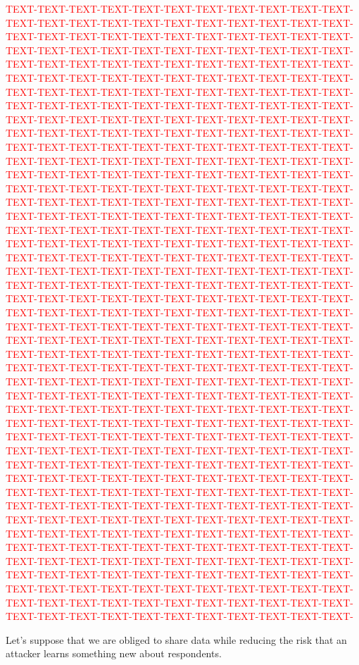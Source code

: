 \documentclass[a0,portrait]{a0poster}
\begin{document}
\begin{multicols}{3}
\textcolor{red}{
TEXT-TEXT-TEXT-TEXT-TEXT-TEXT-TEXT-TEXT-TEXT-TEXT-TEXT-
TEXT-TEXT-TEXT-TEXT-TEXT-TEXT-TEXT-TEXT-TEXT-TEXT-TEXT-
TEXT-TEXT-TEXT-TEXT-TEXT-TEXT-TEXT-TEXT-TEXT-TEXT-TEXT-
TEXT-TEXT-TEXT-TEXT-TEXT-TEXT-TEXT-TEXT-TEXT-TEXT-TEXT-
TEXT-TEXT-TEXT-TEXT-TEXT-TEXT-TEXT-TEXT-TEXT-TEXT-TEXT-
TEXT-TEXT-TEXT-TEXT-TEXT-TEXT-TEXT-TEXT-TEXT-TEXT-TEXT-
TEXT-TEXT-TEXT-TEXT-TEXT-TEXT-TEXT-TEXT-TEXT-TEXT-TEXT-
TEXT-TEXT-TEXT-TEXT-TEXT-TEXT-TEXT-TEXT-TEXT-TEXT-TEXT-
TEXT-TEXT-TEXT-TEXT-TEXT-TEXT-TEXT-TEXT-TEXT-TEXT-TEXT-
TEXT-TEXT-TEXT-TEXT-TEXT-TEXT-TEXT-TEXT-TEXT-TEXT-TEXT-
TEXT-TEXT-TEXT-TEXT-TEXT-TEXT-TEXT-TEXT-TEXT-TEXT-TEXT-
TEXT-TEXT-TEXT-TEXT-TEXT-TEXT-TEXT-TEXT-TEXT-TEXT-TEXT-
TEXT-TEXT-TEXT-TEXT-TEXT-TEXT-TEXT-TEXT-TEXT-TEXT-TEXT-
TEXT-TEXT-TEXT-TEXT-TEXT-TEXT-TEXT-TEXT-TEXT-TEXT-TEXT-
TEXT-TEXT-TEXT-TEXT-TEXT-TEXT-TEXT-TEXT-TEXT-TEXT-TEXT-
TEXT-TEXT-TEXT-TEXT-TEXT-TEXT-TEXT-TEXT-TEXT-TEXT-TEXT-
TEXT-TEXT-TEXT-TEXT-TEXT-TEXT-TEXT-TEXT-TEXT-TEXT-TEXT-
TEXT-TEXT-TEXT-TEXT-TEXT-TEXT-TEXT-TEXT-TEXT-TEXT-TEXT-
TEXT-TEXT-TEXT-TEXT-TEXT-TEXT-TEXT-TEXT-TEXT-TEXT-TEXT-
TEXT-TEXT-TEXT-TEXT-TEXT-TEXT-TEXT-TEXT-TEXT-TEXT-TEXT-
TEXT-TEXT-TEXT-TEXT-TEXT-TEXT-TEXT-TEXT-TEXT-TEXT-TEXT-
TEXT-TEXT-TEXT-TEXT-TEXT-TEXT-TEXT-TEXT-TEXT-TEXT-TEXT-
TEXT-TEXT-TEXT-TEXT-TEXT-TEXT-TEXT-TEXT-TEXT-TEXT-TEXT-
TEXT-TEXT-TEXT-TEXT-TEXT-TEXT-TEXT-TEXT-TEXT-TEXT-TEXT-
TEXT-TEXT-TEXT-TEXT-TEXT-TEXT-TEXT-TEXT-TEXT-TEXT-TEXT-
TEXT-TEXT-TEXT-TEXT-TEXT-TEXT-TEXT-TEXT-TEXT-TEXT-TEXT-
TEXT-TEXT-TEXT-TEXT-TEXT-TEXT-TEXT-TEXT-TEXT-TEXT-TEXT-
TEXT-TEXT-TEXT-TEXT-TEXT-TEXT-TEXT-TEXT-TEXT-TEXT-TEXT-
TEXT-TEXT-TEXT-TEXT-TEXT-TEXT-TEXT-TEXT-TEXT-TEXT-TEXT-
TEXT-TEXT-TEXT-TEXT-TEXT-TEXT-TEXT-TEXT-TEXT-TEXT-TEXT-
TEXT-TEXT-TEXT-TEXT-TEXT-TEXT-TEXT-TEXT-TEXT-TEXT-TEXT-
TEXT-TEXT-TEXT-TEXT-TEXT-TEXT-TEXT-TEXT-TEXT-TEXT-TEXT-
TEXT-TEXT-TEXT-TEXT-TEXT-TEXT-TEXT-TEXT-TEXT-TEXT-TEXT-
TEXT-TEXT-TEXT-TEXT-TEXT-TEXT-TEXT-TEXT-TEXT-TEXT-TEXT-
TEXT-TEXT-TEXT-TEXT-TEXT-TEXT-TEXT-TEXT-TEXT-TEXT-TEXT-
TEXT-TEXT-TEXT-TEXT-TEXT-TEXT-TEXT-TEXT-TEXT-TEXT-TEXT-
TEXT-TEXT-TEXT-TEXT-TEXT-TEXT-TEXT-TEXT-TEXT-TEXT-TEXT-
TEXT-TEXT-TEXT-TEXT-TEXT-TEXT-TEXT-TEXT-TEXT-TEXT-TEXT-
TEXT-TEXT-TEXT-TEXT-TEXT-TEXT-TEXT-TEXT-TEXT-TEXT-TEXT-
TEXT-TEXT-TEXT-TEXT-TEXT-TEXT-TEXT-TEXT-TEXT-TEXT-TEXT-
TEXT-TEXT-TEXT-TEXT-TEXT-TEXT-TEXT-TEXT-TEXT-TEXT-TEXT-
TEXT-TEXT-TEXT-TEXT-TEXT-TEXT-TEXT-TEXT-TEXT-TEXT-TEXT-
TEXT-TEXT-TEXT-TEXT-TEXT-TEXT-TEXT-TEXT-TEXT-TEXT-TEXT-
TEXT-TEXT-TEXT-TEXT-TEXT-TEXT-TEXT-TEXT-TEXT-TEXT-TEXT-
TEXT-TEXT-TEXT-TEXT-TEXT-TEXT-TEXT-TEXT-TEXT-TEXT-TEXT-
}

Let's suppose that we are obliged to share data 
while reducing the risk that an attacker learns something new about respondents.


\end{multicols}
\end{document}
